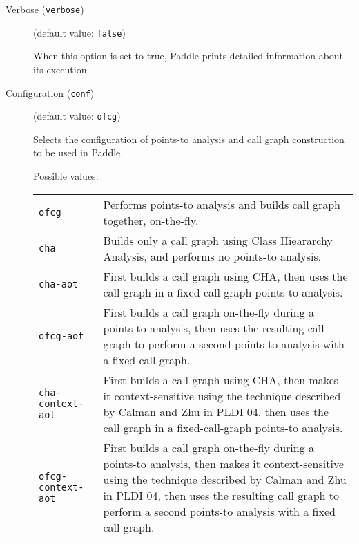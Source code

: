 \documentclass{article}
\begin{document}
\begin{description}

\item[Verbose ({\tt verbose})]
(default value: {\tt false})




When this option is set to true, Paddle prints detailed information about its execution.
        


\item[Configuration ({\tt conf})]
(default value: {\tt ofcg})




Selects the configuration of points-to analysis and call graph construction
to be used in Paddle.
        



Possible values:\\
\begin{longtable}{p{1in}p{4in}}

{\tt ofcg }
&

Performs points-to analysis and builds call graph together, on-the-fly.
\\

{\tt cha }
&

Builds only a call graph using Class Hieararchy Analysis, and performs no
points-to analysis.
\\

{\tt cha-aot }
&

First builds a call graph using CHA, then uses the call graph in a fixed-call-graph points-to analysis.
\\

{\tt ofcg-aot }
&

First builds a call graph on-the-fly during a points-to analysis, then
uses the resulting call graph to perform a second points-to analysis
with a fixed call graph.
\\

{\tt cha-context-aot }
&

First builds a call graph using CHA, then makes it context-sensitive using
the technique described by Calman and Zhu in PLDI 04,
then uses the call graph in a fixed-call-graph points-to analysis.
\\

{\tt ofcg-context-aot }
&

First builds a call graph on-the-fly during a points-to analysis, then
makes it context-sensitive using the technique described by Calman and
Zhu in PLDI 04, then uses the resulting call graph to perform a second
points-to analysis with a fixed call graph.
\\


\end{longtable}
\end{description}
\end{document}
